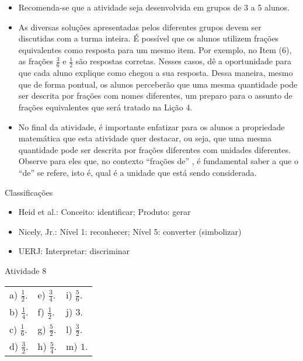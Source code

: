 \documentclass[oneside]{book}
\begin{document}
\begin{multicols}{2}
  
  \vspace{.1cm}

  \begin{itemize} %
    \item       Recomenda-se que a atividade seja desenvolvida em grupos de 3 a 5 alunos.
    \item       As diversas soluções apresentadas pelos diferentes grupos devem ser discutidas com a turma inteira. É possível que os alunos utilizem frações equivalentes como resposta para um mesmo item. Por exemplo, no Item (6), as frações       $\frac{3}{6}$       e       $\frac{1}{2}$       são respostas corretas. Nesses casos, dê a oportunidade para que cada aluno explique como chegou a sua resposta. Dessa maneira, mesmo que de forma pontual, os alunos perceberão que uma mesma quantidade pode ser descrita por frações com nomes diferentes, um preparo para o assunto de frações equivalentes que será tratado na Lição 4.
    \item       No final da atividade, é importante enfatizar para os alunos a propriedade matemática que esta atividade quer destacar, ou seja, que uma mesma quantidade pode ser descrita por frações diferentes com unidades diferentes. Observe para eles que, no contexto       ``frações de''      , é fundamental saber a que o       ``de''       se refere, isto é, qual é a unidade que está sendo considerada.
\end{itemize} %


  Classificações
\begin{itemize} %
    \item       Heid et al.: Conceito: identificar; Produto: gerar
    \item       Nicely, Jr.: Nível 1: reconhecer; Nível 5: converter (simbolizar)
    \item       UERJ: Interpretar: discriminar
\end{itemize} %



\begin{resposta*}{Atividade 8}
\begin{tabular}{m{}m{}m{}}
    a) $\frac{1}{2}$. & e) $\frac{3}{4}$. &  i) $\frac{5}{6}$.\\
    b) $\frac{1}{4}$. & f) $\frac{1}{2}$. &  j) $3$.\\
    c) $\frac{1}{6}$. & g) $\frac{5}{2}$. &  l) $\frac{3}{2}$.\\
    d) $\frac{3}{2}$. & h) $\frac{5}{4}$. &  m) $1$.
\end{tabular} %


\end{resposta*}
\end{multicols}
\end{document}
